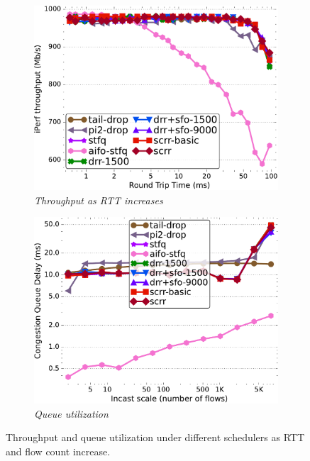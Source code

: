\begin{figure}[t]
	\centering
 	\begin{subfigure}[t]{.49\linewidth}
		\centering
        \includegraphics[width=1\linewidth]{figs/aifo_delay_cn_0_bw_1000_bw_comp_methods.pdf}
    \caption{\small{\textit{Throughput as RTT increases}}}
	\label{fig:aifo-tput}
	\end{subfigure}
	\begin{subfigure}[t]{.49\linewidth}
		\centering
    \includegraphics[width=1\linewidth]{figs/aifo_paral_cn_1t4x1024_qdelay_comp_methods.pdf}
    \caption{\small{\textit{Queue utilization}}}
	\label{fig:aifo-qdelay}
	\end{subfigure}
 \vspace{-2mm}
    \caption{\small{Throughput and queue utilization under different schedulers as RTT and flow count increase.}}
  \vspace{-0.3cm}
\end{figure}
